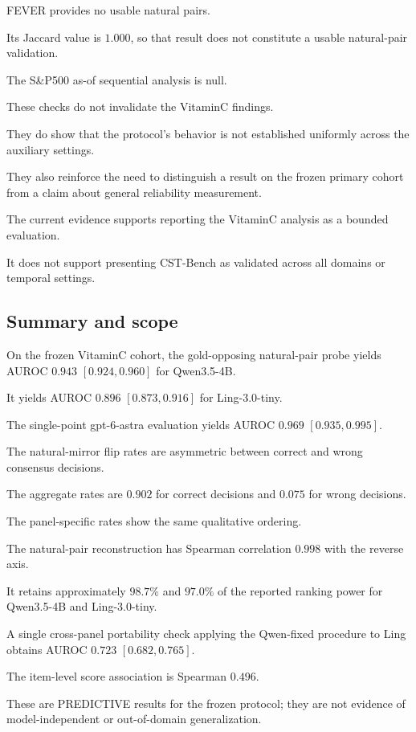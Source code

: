 \documentclass[11pt]{article}
\begin{document}
FEVER provides no usable natural pairs.

Its Jaccard value is \(1.000\), so that result does not constitute a usable natural-pair validation.

The S\&P500 as-of sequential analysis is null.

These checks do not invalidate the VitaminC findings.

They do show that the protocol's behavior is not established uniformly across the auxiliary settings.

They also reinforce the need to distinguish a result on the frozen primary cohort from a claim about general reliability measurement.

The current evidence supports reporting the VitaminC analysis as a bounded evaluation.

It does not support presenting CST-Bench as validated across all domains or temporal settings.

\subsection{Summary and scope}

On the frozen VitaminC cohort, the gold-opposing natural-pair probe yields AUROC \(0.943\) \([0.924,0.960]\) for Qwen3.5-4B.

It yields AUROC \(0.896\) \([0.873,0.916]\) for Ling-3.0-tiny.

The single-point gpt-6-astra evaluation yields AUROC \(0.969\) \([0.935,0.995]\).

The natural-mirror flip rates are asymmetric between correct and wrong consensus decisions.

The aggregate rates are \(0.902\) for correct decisions and \(0.075\) for wrong decisions.

The panel-specific rates show the same qualitative ordering.

The natural-pair reconstruction has Spearman correlation \(0.998\) with the reverse axis.

It retains approximately \(98.7\%\) and \(97.0\%\) of the reported ranking power for Qwen3.5-4B and Ling-3.0-tiny.

A single cross-panel portability check applying the Qwen-fixed procedure to Ling obtains AUROC \(0.723\) \([0.682,0.765]\).

The item-level score association is Spearman \(0.496\).

These are PREDICTIVE results for the frozen protocol; they are not evidence of model-independent or out-of-domain generalization.
\end{document}
